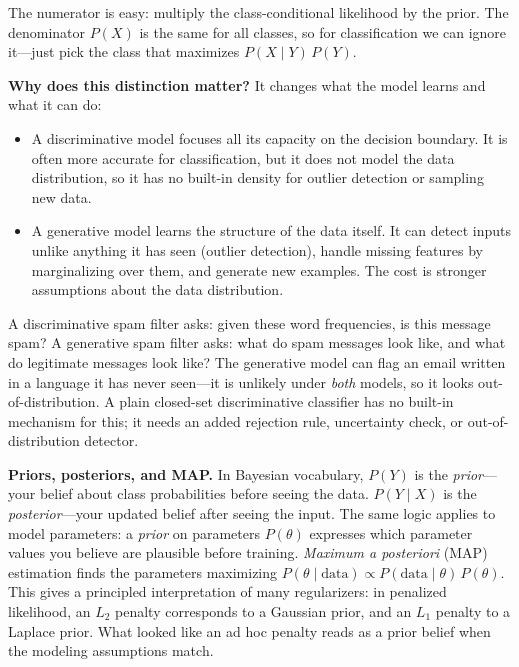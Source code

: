 The numerator is easy: multiply the class-conditional likelihood by the prior. The denominator $P(X)$ is the same for all classes, so for classification we can ignore it---just pick the class that maximizes $P(X \mid Y) \, P(Y)$.

\textbf{Why does this distinction matter?} It changes what the model learns and what it can do:

\begin{itemize}[leftmargin=*]
\item A discriminative model focuses all its capacity on the decision boundary. It is often more accurate for classification, but it does not model the data distribution, so it has no built-in density for outlier detection or sampling new data.
\item A generative model learns the structure of the data itself. It can detect inputs unlike anything it has seen (outlier detection), handle missing features by marginalizing over them, and generate new examples. The cost is stronger assumptions about the data distribution.
\end{itemize}

\begin{example}
A discriminative spam filter asks: given these word frequencies, is this message spam? A generative spam filter asks: what do spam messages look like, and what do legitimate messages look like? The generative model can flag an email written in a language it has never seen---it is unlikely under \emph{both} models, so it looks out-of-distribution. A plain closed-set discriminative classifier has no built-in mechanism for this; it needs an added rejection rule, uncertainty check, or out-of-distribution detector.
\end{example}

\textbf{Priors, posteriors, and MAP.} In Bayesian vocabulary, $P(Y)$ is the \emph{prior}---your belief about class probabilities before seeing the data. $P(Y \mid X)$ is the \emph{posterior}---your updated belief after seeing the input. The same logic applies to model parameters: a \emph{prior} on parameters $P(\theta)$ expresses which parameter values you believe are plausible before training. \emph{Maximum a posteriori} (MAP) estimation finds the parameters maximizing $P(\theta \mid \text{data}) \propto P(\text{data} \mid \theta) \, P(\theta)$. This gives a principled interpretation of many regularizers: in penalized likelihood, an $L_2$ penalty corresponds to a Gaussian prior, and an $L_1$ penalty to a Laplace prior. What looked like an ad hoc penalty reads as a prior belief when the modeling assumptions match.


